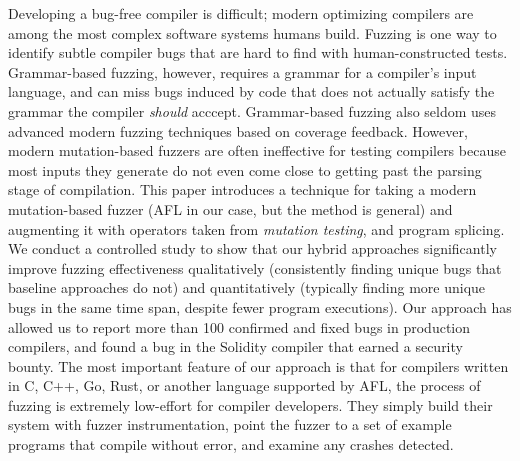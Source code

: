 Developing a bug-free compiler is difficult; modern optimizing compilers are among the most complex software systems humans build.  Fuzzing is one way to identify subtle compiler bugs that are hard to find with human-constructed tests.  Grammar-based fuzzing, however, requires a grammar for a compiler's input language, and can miss bugs induced by code that does not actually satisfy the grammar the compiler \emph{should} acccept.  Grammar-based fuzzing also seldom uses advanced modern fuzzing techniques based on coverage feedback. However, modern mutation-based fuzzers are often ineffective for testing compilers because most inputs they generate do not even come close to getting past the parsing stage of compilation.   This paper introduces a technique for taking a modern mutation-based fuzzer (AFL in our case, but the method is general) and augmenting it with operators taken from \emph{mutation testing}, and program splicing. We conduct a controlled study to show that our hybrid approaches significantly improve fuzzing effectiveness qualitatively (consistently finding unique bugs that baseline approaches do not) and quantitatively (typically finding more unique bugs in the same time span, despite fewer program executions). Our approach has allowed us to report more than 100 confirmed and fixed bugs in production compilers, and found a bug in the Solidity compiler that earned a security bounty.  The most important feature of our approach is that for compilers written in C, C++, Go, Rust, or another language supported by AFL, the process of fuzzing is extremely low-effort for compiler developers.  They simply build their system with fuzzer instrumentation, point the fuzzer to a set of example programs that compile without error, and examine any crashes detected.

